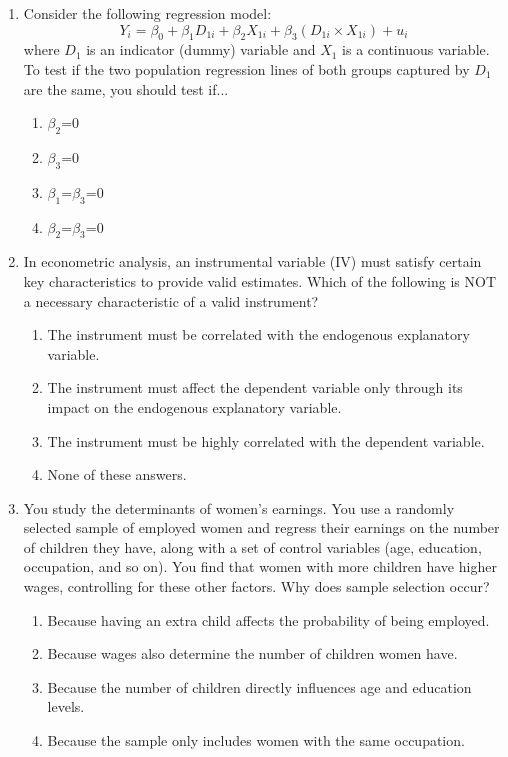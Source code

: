 \documentclass{article}
\begin{document}
\parindent

\begin{enumerate}

    \item Consider the following regression model:
\begin{equation*}
    Y_i = \beta_0 + \beta_1 D_{1i} + \beta_2 X_{1i} + \beta_3 (D_{1i} \times X_{1i}) + u_i
\end{equation*}
where $D_1$ is an indicator (dummy) variable and $X_1$ is a continuous variable. To test if the two population regression lines of both groups captured by $D_1$ are the same, you should test if...
    \begin{enumerate}[label=\alph*)]
        \item $\beta_2$=0
        \item $\beta_3$=0
        \item $\beta_1$=$\beta_3$=0
        \item $\beta_2$=$\beta_3$=0
    \end{enumerate}\vspace{.25cm}

    \item In econometric analysis, an instrumental variable (IV) must satisfy certain key characteristics to provide valid estimates. Which of the following is NOT a necessary characteristic of a valid instrument?
    \begin{enumerate}[label=\alph*)]
        \item The instrument must be correlated with the endogenous explanatory variable.
        \item  The instrument must affect the dependent variable only through its impact on the endogenous explanatory variable.
        \item The instrument must be highly correlated with the dependent variable.
        \item None of these answers.
    \end{enumerate}\vspace{.25cm}

    \item You study the determinants of women’s earnings. You use a randomly selected sample of employed women and regress their earnings on the number of children they have, along with a set of control variables (age, education, occupation, and so on). You find that women with more children have higher wages, controlling for these other factors. Why does sample selection occur?
    \begin{enumerate}[label=\alph*)]
        \item Because having an extra child affects the probability of being employed.
        \item Because wages also determine the number of children women have.
        \item Because the number of children directly influences age and education levels.
        \item Because the sample only includes women with the same occupation.
    \end{enumerate}\vspace{.25cm}



\end{enumerate}
\end{document}
